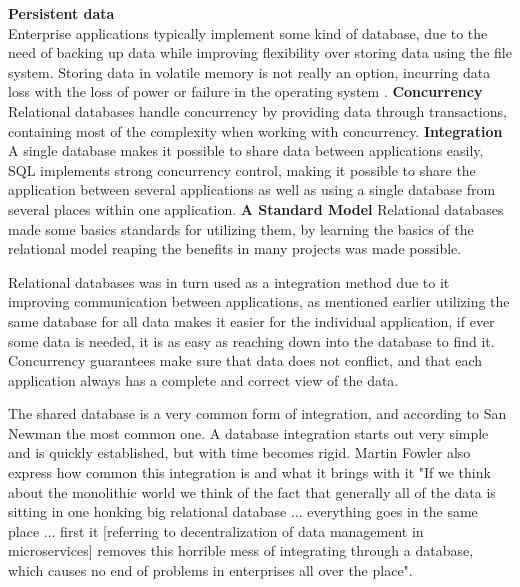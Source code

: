 \textbf{Persistent data}\\
Enterprise applications typically implement some kind of database, due to the need of backing up data while improving flexibility over storing data using the file system. Storing data in volatile memory is not really an option, incurring data loss with the loss of power or failure in the operating system \cite[p.~3]{sadalage2012nosql}. 
\textbf{Concurrency}\\
Relational databases handle concurrency by providing data through transactions, containing most of the complexity when working with concurrency.
\textbf{Integration}\\
A single database makes it possible to share data between applications easily, SQL implements strong concurrency control, making it possible to share the application between several applications as well as using a single database from several places within one application\cite[p.~4]{sadalage2012nosql}. 
\textbf{A Standard Model}
Relational databases made some basics standards for utilizing them, by learning the basics of the relational model reaping the benefits in many projects was made possible.

Relational databases was in turn used as a integration method due to it improving communication between applications, as mentioned earlier utilizing the same database for all data makes it easier for the individual application, if ever some data is needed, it is as easy as reaching down into the database to find it. Concurrency guarantees make sure that data does not conflict, and that each application always has a complete and correct view of the data.

The shared database is a very common form of integration, and according to San Newman the most common one\cite[p.~41]{newman2015microservices}. A database integration starts out very simple and is quickly established, but with time becomes rigid. Martin Fowler also express how common this integration is and what it brings with it "If we think about the monolithic world we think of the fact that generally all of the data is sitting in one honking big relational database ... everything goes in the same place ... first it [referring to decentralization of data management in microservices] removes this horrible mess of integrating through a database, which causes no end of problems in enterprises all over the place"\cite[t.~10:36]{fowler2014microservicesoamonolith}. 


